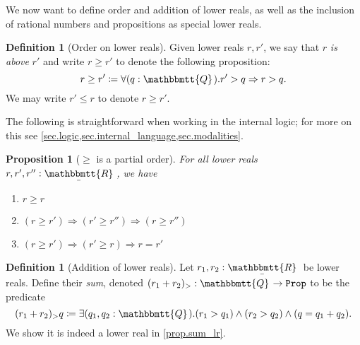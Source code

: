 \documentclass[11pt, oneside, article]{memoir}
\theoremstyle{plain}
\newtheorem{proposition}[theorem]{Proposition}
\theoremstyle{definition}
\newtheorem{definition}[theorem]{Definition}
\theoremstyle{remark}
\newcommand{\const}[1]{\mathtt{#1}}
\newcommand{\ubar}[1]{\underaccent{\bar}{#1}}
\newcommand{\internal}[1]{\raisebox{-.03ex}{$\mathbbmtt{#1}$}}
\newcommand{\hs}{\hspace{1.1pt}}
\newcommand{\tqq}{\internal{Q}\hs}
\newcommand{\trr}{\internal{R}\hs}
\newcommand{\tlrr}{\ubar{\trr}\hs}
\newcommand{\prop}{\const{Prop}}
\newcommand{\imp}{\Rightarrow}
\begin{document}
We now want to define order and addition of lower reals, as well as the inclusion of rational numbers and propositions as special lower reals.

\begin{definition}[Order on lower reals]
Given lower reals $r,r'$,
we say that $r$ \emph{is above} $r'$ and write $r\geq r'$ to denote the following proposition:
\begin{equation}\label{eqn.real_order}
	r\geq r'\coloneqq\forall(q:\tqq).r'>q\imp r>q.
\end{equation}
We may write $r'\leq r$ to denote $r\geq r'$.
\end{definition}

The following is straightforward when working in the internal logic; for more on this see \cref{sec.logic,sec.internal_language,sec.modalities}.

\begin{proposition}[$\geq$ is a partial order]
For all lower reals $r,r',r'':\tlrr$, we have
\begin{enumerate}
	\item $r\geq r$
	\item $(r\geq r')\imp(r'\geq r'')\imp(r\geq r'')$
	\item $(r\geq r')\imp(r'\geq r)\imp r=r'$
\end{enumerate}
\end{proposition}

\begin{definition}[Addition of lower reals]\label{def.sum_lr}
Let $r_1,r_2:\tlrr$ be lower reals. Define their \emph{sum}, denoted $(r_1+r_2)_>:\tqq\to\prop$ to be the predicate
\begin{equation}\label{eqn.sum_lr}
(r_1+r_2)_>q\coloneqq\exists (q_1,q_2:\tqq).(r_1>q_1)\wedge (r_2> q_2)\wedge (q=q_1+q_2).
\end{equation}
We show it is indeed a lower real in \cref{prop.sum_lr}.
\end{definition}
\end{document}
